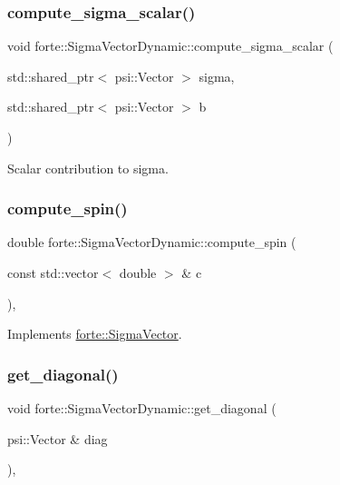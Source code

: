 \subsubsection{\texorpdfstring{compute\+\_\+sigma\+\_\+scalar()}{compute\_sigma\_scalar()}}
{\footnotesize\ttfamily void forte\+::\+Sigma\+Vector\+Dynamic\+::compute\+\_\+sigma\+\_\+scalar (\begin{DoxyParamCaption}\item[{std\+::shared\+\_\+ptr$<$ psi\+::\+Vector $>$}]{sigma,  }\item[{std\+::shared\+\_\+ptr$<$ psi\+::\+Vector $>$}]{b }\end{DoxyParamCaption})\hspace{0.3cm}{\ttfamily [protected]}}



Scalar contribution to sigma. 

\mbox{\label{classforte_1_1_sigma_vector_dynamic_ac8aec7cf6d360cfcd391ea90f68c86ba}} 
\subsubsection{\texorpdfstring{compute\+\_\+spin()}{compute\_spin()}}
{\footnotesize\ttfamily double forte\+::\+Sigma\+Vector\+Dynamic\+::compute\+\_\+spin (\begin{DoxyParamCaption}\item[{const std\+::vector$<$ double $>$ \&}]{c }\end{DoxyParamCaption})\hspace{0.3cm}{\ttfamily [override]}, {\ttfamily [virtual]}}



Implements \mbox{\hyperlink{classforte_1_1_sigma_vector_afe5ac487b5277b86fbe4398ba861773c}{forte\+::\+Sigma\+Vector}}.

\mbox{\label{classforte_1_1_sigma_vector_dynamic_a82c707e8e276ae30fef5d78e473eadc1}} 
\subsubsection{\texorpdfstring{get\+\_\+diagonal()}{get\_diagonal()}}
{\footnotesize\ttfamily void forte\+::\+Sigma\+Vector\+Dynamic\+::get\+\_\+diagonal (\begin{DoxyParamCaption}\item[{psi\+::\+Vector \&}]{diag }\end{DoxyParamCaption})\hspace{0.3cm}{\ttfamily [override]}, {\ttfamily [virtual]}}



